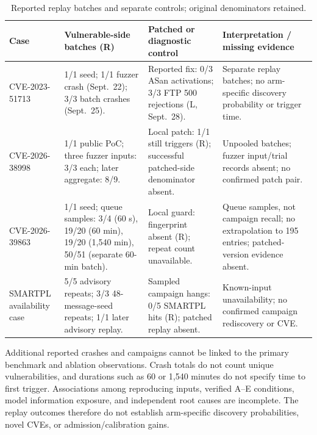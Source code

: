 \documentclass[final,5p,times,number]{elsarticle}
\begin{document}
\begin{table}[!tbp]
\centering\small
\caption{Reported replay batches and separate controls; original denominators retained.}
\label{tab:cveresults}
\begin{tabularx}{\textwidth}{@{}>{\raggedright\arraybackslash}p{} Y Y Y@{}}
\toprule
Case & Vulnerable-side batches (R) & Patched or diagnostic control & Interpretation / missing evidence \\
\midrule
\mbox{CVE-2023-51713} & 1/1 seed; 1/1 fuzzer crash (Sept.~22); 3/3 batch crashes (Sept.~25). & Reported fix: 0/3 ASan activations; 3/3 FTP 500 rejections (L, Sept.~28). & Separate replay batches; no arm-specific discovery probability or trigger time. \\
\addlinespace[3pt]
\mbox{CVE-2026-38998} & 1/1 public PoC; three fuzzer inputs: 3/3 each; later aggregate: 8/9. & Local patch: 1/1 still triggers (R); successful patched-side denominator absent. & Unpooled batches; fuzzer input/trial records absent; no confirmed patch pair. \\
\addlinespace[3pt]
\mbox{CVE-2026-39863} & 1/1 seed; queue samples: 3/4 (60 s), 19/20 (60 min), 19/20 (1,540 min), 50/51 (separate 60-min batch). & Local guard: fingerprint absent (R); repeat count unavailable. & Queue samples, not campaign recall; no extrapolation to 195 entries; patched-version evidence absent. \\
\addlinespace[3pt]
SMARTPL availability case & 5/5 advisory repeats; 3/3 48-message-seed repeats; 1/1 later advisory replay. & Sampled campaign hangs: 0/5 SMARTPL hits (R); patched replay absent. & Known-input unavailability; no confirmed campaign rediscovery or CVE. \\
\bottomrule
\end{tabularx}
\end{table}

Additional reported crashes and campaigns cannot be linked to the primary benchmark and ablation observations. Crash totals do not count unique vulnerabilities, and durations such as 60 or 1,540 minutes do not specify time to first trigger. Associations among reproducing inputs, verified A--E conditions, model information exposure, and independent root causes are incomplete. The replay outcomes therefore do not establish arm-specific discovery probabilities, novel CVEs, or admission/calibration gains.
\end{document}

